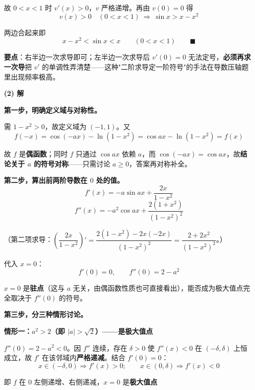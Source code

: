 \begin{answer}
故 $0<x<1$ 时 $v'(x)>0$，$v$ 严格递增。再由 $v(0)=0$ 得
\nopagebreak[4]
\[v(x)>0\quad(0<x<1)\ \Longrightarrow\ \sin x>x-x^{2}\]

两边合起来即
\nopagebreak[4]
\[x-x^{2}<\sin x<x\qquad(0<x<1)\qquad\blacksquare\]

\begin{gktip}
\textbf{要点}：右半边一次求导即可；左半边一次求导后 $v'(0)=0$ 无法定号，\textbf{必须再求一次导}把 $v'$ 的单调性弄清楚——这种"二阶求导定一阶符号"的手法在导数压轴题里出现频率极高。
\end{gktip}

\par\medskip

\textbf{(2) 解}

\textbf{第一步，明确定义域与对称性。}

需 $1-x^{2}>0$，故定义域为 $(-1,1)$。又
\nopagebreak[4]
\[f(-x)=\cos(-ax)-\ln\left(1-x^{2}\right)=\cos ax-\ln\left(1-x^{2}\right)=f(x)\]

故 $f$ 是\textbf{偶函数}；同时 $f$ 只通过 $\cos ax$ 依赖 $a$，而 $\cos(-ax)=\cos ax$，故\textbf{结论关于 $a$ 的符号对称}——只需讨论 $a\ge0$，答案再对称补全。

\textbf{第二步，算出前两阶导数在 $0$ 处的值。}
\nopagebreak[4]
\[f'(x)=-a\sin ax+\frac{2x}{1-x^{2}}\]
\nopagebreak[4]
\[f''(x)=-a^{2}\cos ax+\frac{2\left(1+x^{2}\right)}{\left(1-x^{2}\right)^{2}}\]

（第二项求导：$\left(\dfrac{2x}{1-x^{2}}\right)'=\dfrac{2\left(1-x^{2}\right)-2x(-2x)}{\left(1-x^{2}\right)^{2}}=\dfrac{2+2x^{2}}{\left(1-x^{2}\right)^{2}}$。）

代入 $x=0$：
\nopagebreak[4]
\[f'(0)=0,\qquad f''(0)=2-a^{2}\]

$x=0$ 是\textbf{驻点}（这与 $a$ 无关，由偶函数性质也可直接看出），能否成为极大值点完全取决于 $f''(0)$ 的符号。

\textbf{第三步，分三种情形讨论。}

\textbf{情形一：$a^{2}>2$（即 $|a|>\sqrt2$）——是极大值点 }

$f''(0)=2-a^{2}<0$。因 $f''$ 连续，存在 $\delta>0$ 使 $f''(x)<0$ 在 $(-\delta,\delta)$ 上恒成立，故 $f'$ 在该邻域内\textbf{严格递减}。结合 $f'(0)=0$：
\nopagebreak[4]
\[x\in(-\delta,0)\Rightarrow f'(x)>0;\qquad x\in(0,\delta)\Rightarrow f'(x)<0\]

即 $f$ 在 $0$ 左侧递增、右侧递减，$x=0$ 是\textbf{极大值点} 


\end{answer}
